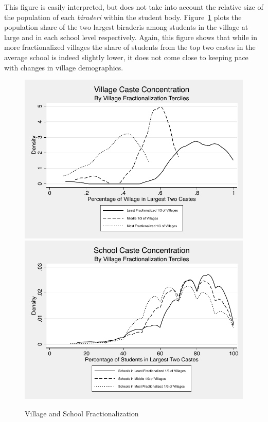 \documentclass[Eubank_pk_ethnic_sorting.tex]{subfiles}
\begin{document}
This figure is easily interpreted, but does not take into account the relative size of the population of each \emph{biraderi} within the student body. Figure~\ref{toptwo} plots the population share of the two largest biraderis among students in the village at large and in each school level respectively. Again, this figure shows that while in more fractionalized villages the share of students from the top two castes in the average school is indeed slightly lower, it does not come close to keeping pace with changes in village demographics.

\begin{figure}[H]
	\begin{center}
		\caption{Village and School Fractionalization}\label{toptwo}
		\includegraphics[scale=.6]{../graphs/village_toptwo.pdf}\includegraphics[scale=0.6]{../graphs/school_toptwo.pdf}
	\end{center}
\end{figure}
\end{document}
